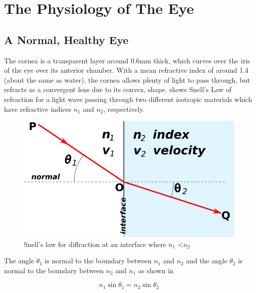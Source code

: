 
\chapter{The Physiology of The Eye}

\label{anatomy}
\section{A Normal, Healthy Eye}
\label{anatomy}

The cornea is a transparent layer around 0.6mm thick, which curves over
the iris of the eye over its anterior chamber.
\cite{yaylali1997corneal,thoft1983x,patel1994refractive}
With a mean refractive index of around 1.4 (about the same as water),
the cornea allows plenty of light to pass through, but refracts as a
convergent lens due to its convex, shape.  shows
Snell's Law of refraction for a light wave passing through two different
isotropic materials which have refractive indices $n_1$
and $n_2$, respectively.

\begin{figure}[htbp]
  \centering
    \includegraphics{figures/snells}
  \caption{Snell's law for diffraction at an interface where $n_1$ \textless $n_2$}
  \label{fig:snell}
\end{figure}

The angle $\theta_1$ is normal to the boundary between $n_1$ and $n_2$
and the angle $\theta_2$ is normal to the boundary between $n_2$ and $n_1$
as shown in 

\begin{equation}
n_1\sin\theta_1=n_2\sin\theta_2
\label{eq:refractive}
\end{equation}

